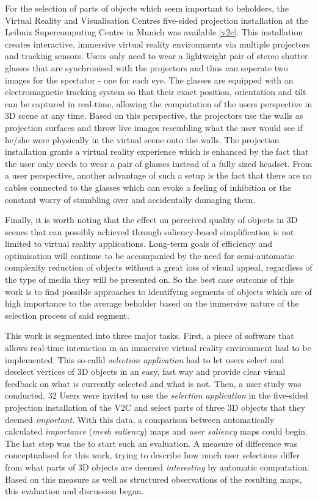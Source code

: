 For the selection of parts of objects which seem important to beholders, the Virtual Reality and Visualisation Centres five-sided projection installation at the Leibniz Supercomputing Centre in Munich was available \ref{v2c}. This installation creates interactive, immersive virtual reality environments via multiple projectors and tracking sensors. Users only need to wear a lightweight pair of stereo shutter glasses that are synchronised with the projectors and thus can seperate two images for the spectator - one for each eye. The glasses are equipped with an electromagnetic tracking system so that their exact position, orientation and tilt can be captured in real-time, allowing the computation of the users perspective in 3D scene at any time. Based on this perspective, the projectors use the walls as projection surfaces and throw live images resembling what the user would see if he/she were physically in the virtual scene onto the walls. The projection installation grants a virtual reality experience which is enhanced by the fact that the user only needs to wear a pair of glasses instead of a fully sized headset. From a user perspective, another advantage of such a setup is the fact that there are no cables connected to the glasses which can evoke a feeling of inhibition or the constant worry of stumbling over and accidentally damaging them.

Finally, it is worth noting that the effect on perceived quality of objects in 3D scenes that can possibly achieved through saliency-based simplification is not limited to virtual reality applications. Long-term goals of efficiency and optimisation will continue to be accompanied by the need for semi-automatic complexity reduction of objects without a great loss of visual appeal, regardless of the type of media they will be presented on. So the best case outcome of this work is to find possible approaches to identifying segments of objects which are of high importance to the average beholder based on the immersive nature of the selection process of said segment.

This work is segmented into three major tasks. First, a piece of software that allows real-time interaction in an immersive virtual reality environment had to be implemented. This so-calld \textit{selection application} had to let users select and deselect vertices of 3D objects in an easy, fast way and provide clear visual feedback on what is currently selected and what is not. Then, a user study was conducted. 32 Users were invited to use the \textit{selection application} in the five-sided projection installation of the V2C \cite{v2c} and select parts of three 3D objects that they deemed \textit{important}. With this data, a comparison between automatically calculated \textit{importance} (\textit{mesh saliency}) maps and \textit{user saliency} maps could begin. The last step was the to start such an evaluation. A measure of difference was conceptualised for this work, trying to describe how much user selections differ from what parts of 3D objects are deemed \textit{interesting} by automatic computation. Based on this measure as well as structured observations of the resulting maps, this evaluation and discussion began.

